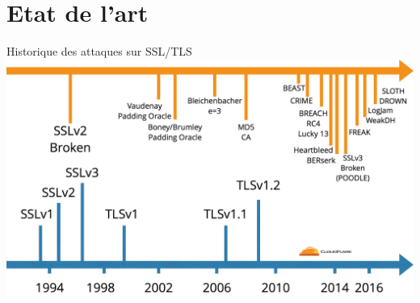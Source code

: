 \section{Etat de l'art}


\begin{frame}{Historique des attaques sur SSL/TLS}
    \includegraphics[width=\linewidth]{../medias/history-tls-attacks.png}
\end{frame}



